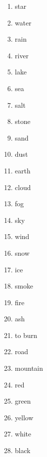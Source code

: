 \documentclass[a5,landscape]{article}
\begin{document}
{\begin{multicols}{4}
\begin{enumerate}
\item   star 

\item   water 

\item   rain 

\item   river 

\item   lake 

\item   sea 

\item   salt 

\item   stone 

\item   sand 

\item   dust 

\item   earth 

\item   cloud 

\item   fog 

\item   sky 

\item   wind 

\item   snow 

\item   ice 

\item   smoke 

\item   fire 

\item   ash 

\item   to burn 

\item   road 

\item   mountain 

\item   red 

\item   green 

\item   yellow 

\item   white 

\item   black 


\end{enumerate}
\end{multicols}}
\end{document}
